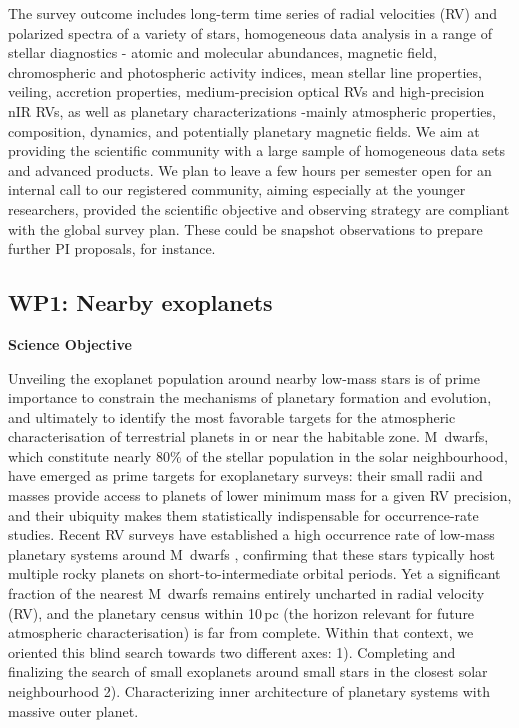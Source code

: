 \documentclass[
    traditabstract,
    longauth,
    onecolumn,
]{aa}
\begin{document}
The survey outcome includes long-term time series of radial velocities (RV) and polarized spectra of a variety of stars, homogeneous data analysis in a range of stellar diagnostics - atomic and molecular abundances, magnetic field, chromospheric and photospheric activity indices, mean stellar line properties, veiling, accretion properties, medium-precision optical RVs and high-precision nIR RVs, as well as planetary characterizations -mainly atmospheric properties, composition, dynamics, and potentially planetary magnetic fields. We aim at providing the scientific community with a large sample of homogeneous data sets and advanced products. We plan to leave a few hours per semester open for an internal call to our registered community, aiming especially at the younger researchers, provided the scientific objective and observing strategy are compliant with the global survey plan. These could be snapshot observations to prepare further PI proposals, for instance.\\

\subsection{WP1: Nearby exoplanets}

\textbf{Science Objective} 


Unveiling the exoplanet population around nearby low-mass stars is of prime importance to constrain the mechanisms of planetary formation and evolution, and ultimately to identify the most favorable targets for the atmospheric characterisation of terrestrial planets in or near the habitable zone.
M~dwarfs, which constitute nearly 80\% of the stellar population in the solar neighbourhood, have emerged as prime targets for exoplanetary surveys: their small radii and masses provide access to planets of lower minimum mass for a given RV precision, and their ubiquity makes them statistically indispensable for occurrence-rate studies.
Recent RV surveys have established a high occurrence rate of low-mass planetary systems around M~dwarfs \citep{ribas2023, Mignon2025}, confirming that these stars typically host multiple rocky planets on short-to-intermediate orbital periods.
Yet a significant fraction of the nearest M~dwarfs remains entirely uncharted in radial velocity (RV), and the planetary census within 10\,pc (the horizon relevant for future atmospheric characterisation) is far from complete.
Within that context, we oriented this blind search towards two different axes: 1). Completing and finalizing the search of small exoplanets around small stars in the closest solar neighbourhood 2). Characterizing inner architecture of planetary systems with massive outer planet.
\end{document}

